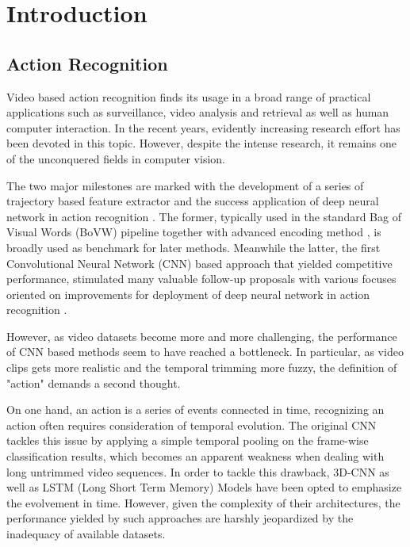 
\setcounter{chapter}{0}

\chapter{Introduction}\label{chap:intro}
\section{Action Recognition}
Video based action recognition finds its usage in a broad range of practical applications such as surveillance, video analysis and retrieval as well as human computer interaction. In the recent years, evidently increasing research effort has been devoted in this topic. However, despite the intense research, it remains one of the unconquered fields in computer vision.

The two major milestones are marked with the development of a series of trajectory based feature extractor \cite{wang2011action,wang2013action} and the success application of deep neural network in action recognition \cite{simonyan2014two}. 
The former, typically used in the standard Bag of Visual Words (BoVW) pipeline together with advanced encoding method \cite{perronnin2010improving, peng2014action}, is broadly used as benchmark for later methods. 
Meanwhile the latter, the first Convolutional Neural Network (CNN) \cite{lecun1989backpropagation} based approach that yielded competitive performance, stimulated many valuable follow-up proposals with various focuses oriented on improvements for deployment of deep neural network in action recognition \cite{wang2015temporal,xiong2015recognize}.

However, as video datasets become more and more challenging, the performance of CNN based methods seem to have reached a bottleneck. 
In particular, as video clips gets more realistic and the temporal trimming more fuzzy, the definition of "action" demands a second thought. 

On one hand, an action is a series of events connected in time, recognizing an action often requires consideration of temporal evolution. 
The original CNN tackles this issue by applying a simple temporal pooling on the frame-wise classification results, which becomes an apparent weakness when dealing with long untrimmed video sequences. 
In order to tackle this drawback, 3D-CNN \cite{ji20133d} as well as LSTM (Long Short Term Memory) Models \cite{donahue2015long,yue2015beyond} have been opted to emphasize the evolvement in time. 
However, given the complexity of their architectures, the performance yielded by such approaches are harshly jeopardized by the inadequacy of available datasets.

